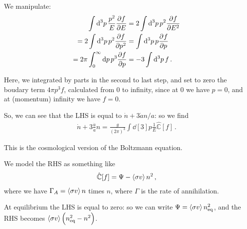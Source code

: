 \documentclass[main.tex]{subfiles}
\begin{document}
We manipulate: 
%
\begin{subequations}
\begin{align}
  \int \dd[3]{p} \frac{p^2}{E} \pdv{f}{E} 
  &= 2 \int \dd[3]{p} p^2 \pdv{f}{E^2} \\
  = 2 \int \dd[3]{p} p^2 \pdv{f}{p^2} 
  &= \int \dd[3]{p} p \pdv[]{f}{p} \\
  = 2 \pi \int_{0}^{ \infty } \dd{p} p^3 \pdv{f}{p} 
  &= -3 \int \dd[3]{p} f
\,.
\end{align}
\end{subequations}
%

Here, we integrated by parts in the second to last step, and set to zero the boudary term \(4 \pi p^3 f\), calculated from 0 to infinity, since at \(0\) we have \(p=0\), and at (momentum) infinity we have \(f=0\).

So, we can see that the LHS is equal to \(\dot{n} + 3 \dot{a}n/a \): so we find 
%
\begin{align}
  \dot{n} + 3 \frac{\dot{a}}{a} n = \frac{g}{(2 \pi )^3} \int \dd[3]{p} \frac{1}{E} \hat{\mathbb{C}} [f]
\,.
\end{align}

This is the cosmological version of the Boltzmann equation. 

We model the RHS as something like 
%
\begin{align}
  \hat{\mathbb{C}}[f] = \Psi - \expval{\sigma v } n^2
\,,
\end{align}
%
where we have \(\Gamma_A = \expval{\sigma v} n\) times \(n\), where \(\Gamma \) is the rate of annihilation. 

At equilibrium the LHS is 
equal to zero: so we can write \(\Psi = \expval{\sigma v} n^2 _{\text{eq}}\), and the RHS becomes \(\expval{\sigma v} \qty(n^2 _{\text{eq}} - n^2)\).
\end{document}
